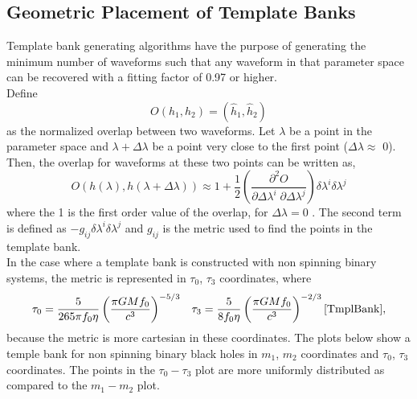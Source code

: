 \documentclass{article}
\begin{document}
\subsection{Geometric Placement of Template Banks} \label{GeomTmplBank}
Template bank generating algorithms have the purpose of generating the minimum number of waveforms such that any waveform in that parameter space can be recovered with a fitting factor of 0.97 or higher. \\
Define 
\begin{equation}
    O(h_1, h_2) = \left( \hat{h}_1, \hat{h}_2\right)
\end{equation}
as the normalized overlap between two waveforms. Let $\lambda$ be a point in the parameter space and $\lambda + \Delta\lambda$ be a point very close to the first point ($\Delta\lambda \approx $ 0).
Then, the overlap for waveforms at these two points can be written as,
\begin{equation}
    O(h(\lambda), h(\lambda + \Delta\lambda)) \approx 1 + \frac{1}{2} \left (\frac{\partial^2O}{\partial\Delta\lambda^i \; \partial\Delta\lambda^j} \right) \delta\lambda^i \delta\lambda^j
\end{equation}
where the 1 is the first order value of the overlap, for $\Delta\lambda = 0$ . The second term is defined as $-g_{ij}\delta\lambda^i \delta\lambda^j$ and $g_{ij}$ is the metric used to find the points in the template bank. \\
In the case where a template bank is constructed with non spinning binary systems, the metric is represented in $\tau_0$, $\tau_3$ coordinates, where
\begin{equation}
    \tau_0 = \frac{5}{265 \pi f_0 \eta}\left(\frac{\pi G M f_0}{c^3}\right)^{-5/3} \;\;\; \tau_3 = \frac{5}{8 f_0 \eta} \left( \frac{\pi G M f_0}{c^3}\right)^{-2/3} \cite{TmplBank},
\end{equation}
because the metric is more cartesian in these coordinates. The plots below show a temple bank for non spinning binary black holes in $m_1$, $m_2$ coordinates and $\tau_0$, $\tau_3$ coordinates. The points in the $\tau_0 - \tau_3$ plot are more uniformly distributed as compared to the $m_1 - m_2$ plot.
\end{document}

